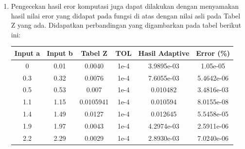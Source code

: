 \documentclass[journal,12pt,onecolumn,a4paper]{IEEEtran}
\begin{document}
\begin{enumerate}
\begin{lstlisting}[language=Octave]
				printf("----------")
				printf("\nHasil NormCDF for Z value (Actual Value)\n: %d", cdf_ans)
				printf("\nEror P(Z <= b) - P(Z <= a)  Vs. Metode NormCDF: %d\n", err_cdf)
				printf("\nEror P(a <= Z <= b) Vs. Metode NormCDF: %d\n", err_cdf_ab)
			\end{lstlisting}

	      dengan hasil sebagai berikut

	      \begin{lstlisting}[language=Octave]
				Hasil NormCDF for Z value (Actual Value): 0.682689492137086
				Eror P(Z <= b) - P(Z <= a)  Vs. Metode NormCDF: 1.123183690499019e-08
				Eror P(a <= Z <= b) Vs. Metode NormCDF: 3.181731832446744e-07
			\end{lstlisting}

	      Keluaran perbandingan nilai aproksimasi integrasi percobaan ini dengan fungsi \lstinline{quadgk} dan \lstinline{normcdf} memiliki besar perbedaan nilai
	      yang hampir serupa di atas yaitu untuk \(P(a \le Z \le b)= 1.123183690499019e-08\)  dan \(P(Z \le b ) - P(Z \le a ) = 3.181731832446744e-07\).
	      Dengan begitu dapat dikatakan fungsi aproksimasi dengan metode
	      Adaptive Trapezoid ini sudah cukup akurat menyesuaikan dengan fungsi bawaan Octave yaitu \lstinline{quadgk} dan utamanya \lstinline{normcdf} yang merupakan fungsi distribusi normal.

	\item
	      Pengecekan hasil eror komputasi juga dapat dilakukan dengan menyamakan hasil nilai eror yang didapat pada fungsi di atas dengan nilai asli pada Tabel Z yang ada. Didapatkan perbandingan yang digambarkan pada tabel berikut ini:
	      \begin{center}
		      \begin{table}[H] %
			      \centering %
			      \begin{tabular}{cccccc}
				      \toprule
				      Input a & Input b & Tabel Z   & TOL  & Hasil Adaptive & Error (\%) \\ %
				      \midrule
				      0       & 0.01    & 0.0040    & 1e-4 & 3.9895e-03     & 1.05e-05   \\
				      0.3     & 0.32    & 0.0076    & 1e-4 & 7.6055e-03     & 5.4642e-06 \\
				      0.5     & 0.53    & 0.007     & 1e-4 & 0.010482       & 3.4816e-03 \\
				      1.1     & 1.15    & 0.0105941 & 1e-4 & 0.010594       & 8.0155e-08 \\
				      1.4     & 1.49    & 0.0127    & 1e-4 & 0.012645       & 5.5458e-05 \\
				      1.9     & 1.97    & 0.0043    & 1e-4 & 4.2974e-03     & 2.5911e-06 \\
				      2.2     & 2.29    & 0.0029    & 1e-4 & 2.8930e-03     & 7.0240e-06 \\


\end{tabular}
\end{table}
\end{center}
\end{enumerate}
\end{document}
